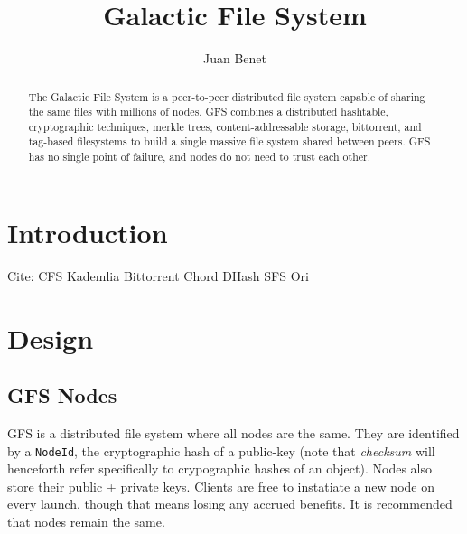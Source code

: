 \documentclass{sig-alternate}
\begin{document}

\title{Galactic File System}
\subtitle{}


\author{
%
%
\alignauthor
  Juan Benet\\
}

\maketitle
\begin{abstract}
The Galactic File System is a peer-to-peer distributed file system capable of
sharing the same files with millions of nodes. GFS combines a distributed
hashtable, cryptographic techniques, merkle trees, content-addressable
storage, bittorrent, and tag-based filesystems to build a single massive
file system shared between peers. GFS has no single point of failure, and
nodes do not need to trust each other.
\end{abstract}

\section{Introduction}

Cite:
CFS
Kademlia
Bittorrent
Chord
DHash
SFS
Ori

\section{Design}

\subsection{GFS Nodes}

GFS is a distributed file system where all nodes are the same. They are
identified by a \texttt{NodeId}, the cryptographic hash of a public-key
(note that \textit{checksum} will henceforth refer specifically to crypographic
hashes of an object). Nodes also store their public + private keys. Clients are
free to instatiate a new node on every launch, though that means losing any
accrued benefits. It is recommended that nodes remain the same.
\end{document}
